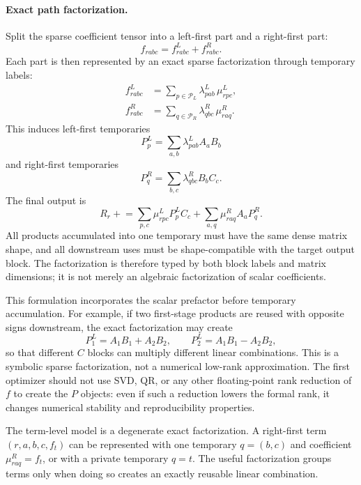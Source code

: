 \documentclass[11pt]{article}
\begin{document}
\paragraph{Exact path factorization.}
Split the sparse coefficient tensor into a left-first part and a right-first
part:
\begin{equation}
  f_{rabc} = f^L_{rabc} + f^R_{rabc}.
\end{equation}
Each part is then represented by an exact sparse factorization through
temporary labels:
\begin{align}
  f^L_{rabc} &= \sum_{p \in \mathcal{P}_L}
    \lambda^L_{pab}\,\mu^L_{rpc}, \\
  f^R_{rabc} &= \sum_{q \in \mathcal{P}_R}
    \lambda^R_{qbc}\,\mu^R_{raq}.
\end{align}
This induces left-first temporaries
\begin{equation}
  P^L_p = \sum_{a,b} \lambda^L_{pab} A_a B_b
\end{equation}
and right-first temporaries
\begin{equation}
  P^R_q = \sum_{b,c} \lambda^R_{qbc} B_b C_c.
\end{equation}
The final output is
\begin{equation}
  R_r \mathrel{+}=
    \sum_{p,c} \mu^L_{rpc} P^L_p C_c
  + \sum_{a,q} \mu^R_{raq} A_a P^R_q .
\end{equation}
All products accumulated into one temporary must have the same dense matrix
shape, and all downstream uses must be shape-compatible with the target
output block.  The factorization is therefore typed by both block labels and
matrix dimensions; it is not merely an algebraic factorization of scalar
coefficients.

This formulation incorporates the scalar prefactor before temporary
accumulation.  For example, if two first-stage products are reused with
opposite signs downstream, the exact factorization may create
\begin{equation}
  P^L_1 = A_1B_1 + A_2B_2,
  \qquad
  P^L_2 = A_1B_1 - A_2B_2,
\end{equation}
so that different $C$ blocks can multiply different linear combinations.  This
is a symbolic sparse factorization, not a numerical low-rank approximation.
The first optimizer should not use SVD, QR, or any other floating-point rank
reduction of $f$ to create the $P$ objects: even if such a reduction lowers the
formal rank, it changes numerical stability and reproducibility properties.

The term-level model is a degenerate exact factorization.  A right-first term
$(r,a,b,c,f_t)$ can be represented with one temporary $q=(b,c)$ and coefficient
$\mu^R_{raq}=f_t$, or with a private temporary $q=t$.  The useful
factorization groups terms only when doing so creates an exactly reusable
linear combination.
\end{document}
